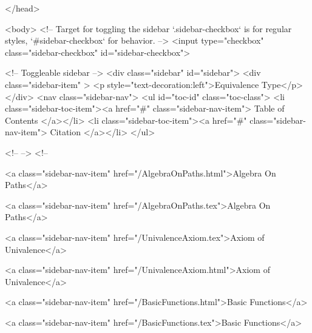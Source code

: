   
</head>




  <body>
    <!-- Target for toggling the sidebar `.sidebar-checkbox` is for regular
     styles, `#sidebar-checkbox` for behavior. -->
<input type="checkbox" class="sidebar-checkbox" id="sidebar-checkbox">

<!-- Toggleable sidebar -->
<div class="sidebar" id="sidebar">
  <div class="sidebar-item" >
    <p style="text-decoration:left">Equivalence Type</p>
  </div>
  <nav class="sidebar-nav">
    <ul id="toc-id" class="toc-class">
  <li class="sidebar-toc-item"><a href="#" class="sidebar-nav-item"> Table of Contents </a></li>
  <li class="sidebar-toc-item"><a href="#" class="sidebar-nav-item"> Citation </a></li>
</ul>


    <!--  -->
    <!-- 
      
    
      
    
      
    
      
        
      
    
      
        
          <a class="sidebar-nav-item" href="/AlgebraOnPaths.html">Algebra On Paths</a>
        
      
    
      
        
          <a class="sidebar-nav-item" href="/AlgebraOnPaths.tex">Algebra On Paths</a>
        
      
    
      
        
          <a class="sidebar-nav-item" href="/UnivalenceAxiom.tex">Axiom of Univalence</a>
        
      
    
      
        
          <a class="sidebar-nav-item" href="/UnivalenceAxiom.html">Axiom of Univalence</a>
        
      
    
      
        
          <a class="sidebar-nav-item" href="/BasicFunctions.html">Basic Functions</a>
        
      
    
      
        
          <a class="sidebar-nav-item" href="/BasicFunctions.tex">Basic Functions</a>
        
      
    
      
        
